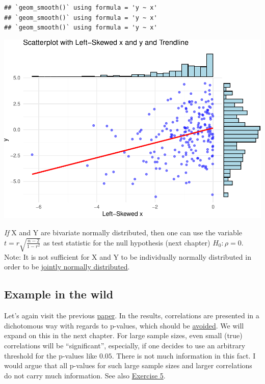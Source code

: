 \documentclass[
]{book}
\newcommand{\pandocbounded}[1]{#1}
\begin{document}
\begin{verbatim}
## `geom_smooth()` using formula = 'y ~ x'
## `geom_smooth()` using formula = 'y ~ x'
## `geom_smooth()` using formula = 'y ~ x'
\end{verbatim}

\pandocbounded{\includegraphics[keepaspectratio]{_main_files/figure-latex/unnamed-chunk-22-1.pdf}}

\emph{If} X and Y are bivariate normally distributed, then one can use the variable
\(t = r \sqrt{\frac{n-2}{1-r^2}}\) as test statistic for the null hypothesis (next chapter) \(H_0: \rho = 0\).
Note: It is not sufficient for X and Y to be individually normally distributed in order to
be \href{https://en.wikipedia.org/wiki/Multivariate_normal_distribution\#Bivariate_case}{jointly normally distributed}.

\subsection{Example in the wild}\label{example-in-the-wild-1}

Let's again visit the previous \href{https://bmjopen.bmj.com/content/9/4/e023341}{paper}.
In the results, correlations are presented in a dichotomous way with regards to p-values,
which should be \href{https://www.tandfonline.com/doi/full/10.1080/00031305.2019.1583913}{avoided}.
We will expand on this in the next chapter. For large sample sizes, even small (true) correlations will be ``significant'',
especially, if one decides to use an arbitrary threshold for the p-values like \(0.05\). There is not much information
in this fact. I would argue that all p-values for such large sample sizes and larger correlations do not carry much information.
See also \hyperref[exercise5_descriptive_stats]{Exercise 5}.
\end{document}
